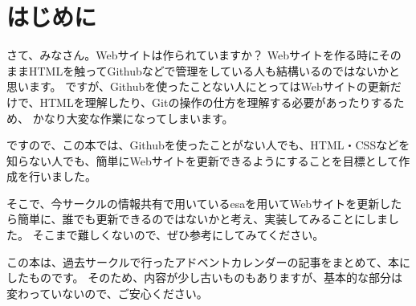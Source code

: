 \chapter{はじめに}

さて、みなさん。Webサイトは作られていますか？
Webサイトを作る時にそのままHTMLを触ってGithubなどで管理をしている人も結構いるのではないかと思います。
ですが、Githubを使ったことない人にとってはWebサイトの更新だけで、HTMLを理解したり、Gitの操作の仕方を理解する必要があったりするため、
かなり大変な作業になってしまいます。

ですので、この本では、Githubを使ったことがない人でも、HTML・CSSなどを知らない人でも、簡単にWebサイトを更新できるようにすることを目標として作成を行いました。

そこで、今サークルの情報共有で用いているesaを用いてWebサイトを更新したら簡単に、誰でも更新できるのではないかと考え、実装してみることにしました。
そこまで難しくないので、ぜひ参考にしてみてください。

この本は、過去サークルで行ったアドベントカレンダーの記事をまとめて、本にしたものです。
そのため、内容が少し古いものもありますが、基本的な部分は変わっていないので、ご安心ください。